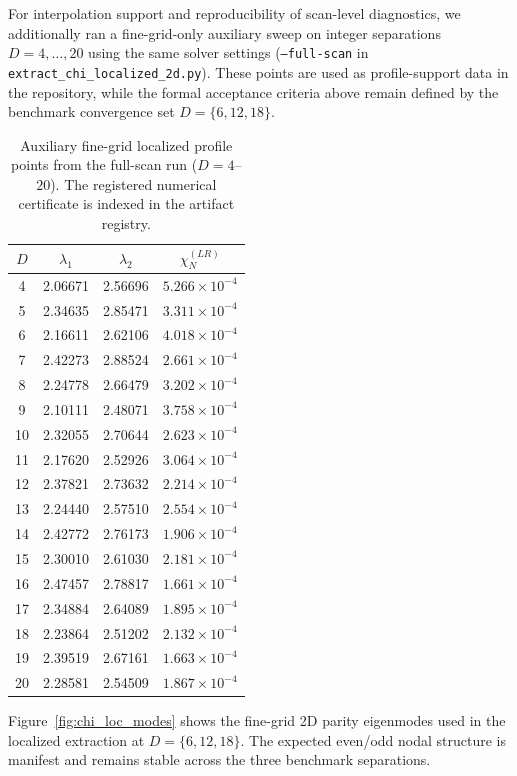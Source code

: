 \documentclass[aps,prd,onecolumn,notitlepage,nofootinbib,superscriptaddress,11pt,floatfix]{revtex4-2}
\begin{document}
For interpolation support and reproducibility of scan-level diagnostics, we additionally ran a fine-grid-only auxiliary sweep on integer separations $D=4,\dots,20$ using the same solver settings (\texttt{--full-scan} in \texttt{extract\_chi\_localized\_2d.py}). These points are used as profile-support data in the repository, while the formal acceptance criteria above remain defined by the benchmark convergence set $D=\{6,12,18\}$.

\begin{table}[t]
\centering
\caption{Auxiliary fine-grid localized profile points from the full-scan run ($D=4$--$20$). The registered numerical certificate is indexed in the artifact registry.}
\label{tab:chi_loc_full}
\small
\begin{tabular}{cccc}
\hline\hline
$D$ & $\lambda_1$ & $\lambda_2$ & $\chi_N^{(LR)}$ \\
\hline
4  & 2.06671 & 2.56696 & $5.266\times10^{-4}$ \\
5  & 2.34635 & 2.85471 & $3.311\times10^{-4}$ \\
6  & 2.16611 & 2.62106 & $4.018\times10^{-4}$ \\
7  & 2.42273 & 2.88524 & $2.661\times10^{-4}$ \\
8  & 2.24778 & 2.66479 & $3.202\times10^{-4}$ \\
9  & 2.10111 & 2.48071 & $3.758\times10^{-4}$ \\
10 & 2.32055 & 2.70644 & $2.623\times10^{-4}$ \\
11 & 2.17620 & 2.52926 & $3.064\times10^{-4}$ \\
12 & 2.37821 & 2.73632 & $2.214\times10^{-4}$ \\
13 & 2.24440 & 2.57510 & $2.554\times10^{-4}$ \\
14 & 2.42772 & 2.76173 & $1.906\times10^{-4}$ \\
15 & 2.30010 & 2.61030 & $2.181\times10^{-4}$ \\
16 & 2.47457 & 2.78817 & $1.661\times10^{-4}$ \\
17 & 2.34884 & 2.64089 & $1.895\times10^{-4}$ \\
18 & 2.23864 & 2.51202 & $2.132\times10^{-4}$ \\
19 & 2.39519 & 2.67161 & $1.663\times10^{-4}$ \\
20 & 2.28581 & 2.54509 & $1.867\times10^{-4}$ \\
\hline\hline
\end{tabular}
\end{table}

Figure~\ref{fig:chi_loc_modes} shows the fine-grid 2D parity eigenmodes used in the localized extraction at $D=\{6,12,18\}$. The expected even/odd nodal structure is manifest and remains stable across the three benchmark separations.
\end{document}
